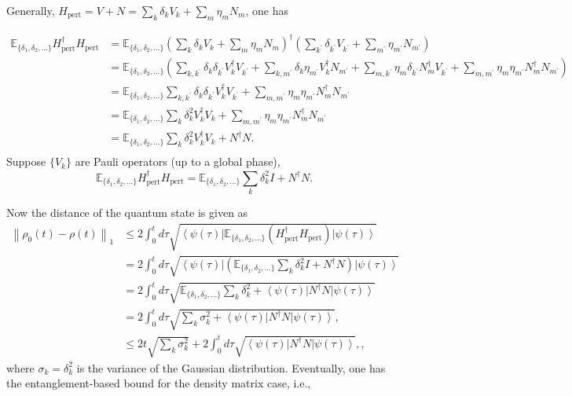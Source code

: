 \documentclass[12pt]{article}
\newcommand{\ket}[1]{\left|#1\right\rangle}
\newcommand{\bra}[1]{\left\langle #1\right|}
\newcommand{\norm}[1]{\left\lVert #1\right\rVert}
\begin{document}
Generally, $H_{\text{pert}} = V+N=\sum_k\delta_k V_k+\sum_m\eta_m N_m$, one has

\begin{equation}
\begin{split}
    \mathbb{E}_{\{\delta_1,\delta_2,...\}}H_{\text{pert}}^\dagger H_{\text{pert}}&=  \mathbb{E}_{\{\delta_1,\delta_2,...\}} (\sum_k \delta_k V_k + \sum_m \eta_m N_m)^\dagger(\sum_{k^\prime} \delta_{k^\prime} V_{k^\prime} + \sum_{m^\prime} \eta_{m^\prime} N_{m^\prime})    \\
    &= \mathbb{E}_{\{\delta_1,\delta_2,...\}}(\sum_{k,k^\prime}\delta_k\delta_{k^\prime} V^\dagger_kV_{k^\prime}+\sum_{k,m^\prime}\delta_k\eta_{m^\prime} V^\dagger_kN_{m^\prime}+\sum_{m,k^\prime}\eta_m\delta_{k^\prime} N^\dagger_mV_{k^\prime}+\sum_{m,m^\prime}\eta_m\eta_{m^\prime} N^\dagger_mN_{m^\prime})\\
    &=\mathbb{E}_{\{\delta_1,\delta_2,...\}}\sum_{k,k^\prime}\delta_k\delta_{k^\prime} V^\dagger_kV_{k^\prime}+\sum_{m,m^\prime}\eta_m\eta_{m^\prime} N^\dagger_mN_{m^\prime}\\
    &=\mathbb{E}_{\{\delta_1,\delta_2,...\}}\sum_{k}\delta^2_k V^\dagger_kV_{k}+\sum_{m,m^\prime}\eta_m\eta_{m^\prime} N^\dagger_mN_{m^\prime}\\
    &=\mathbb{E}_{\{\delta_1,\delta_2,...\}}\sum_{k}\delta^2_k V^\dagger_kV_{k}+N^\dagger N.\\
\end{split}
\end{equation}
Suppose $\{V_k\}$ are Pauli operators (up to a global phase), 
\begin{equation}
     \mathbb{E}_{\{\delta_1,\delta_2,...\}}H_{\text{pert}}^\dagger H_{\text{pert}}=\mathbb{E}_{\{\delta_1,\delta_2,...\}}\sum_{k}\delta^2_k I+N^\dagger N.
\end{equation}

Now the distance of the quantum state is given as
\begin{equation}
\begin{split}
\norm{ \rho_0(t)-\rho(t) }_1 &\le 2 \int_0 ^t d\tau \sqrt{\bra{\psi(\tau)} \mathbb{E}_{\{\delta_1,\delta_2,...\}}( H_{\text{pert}}^\dagger H_{\text{pert}} )\ket{\psi(\tau)}}\\
&=2 \int_0 ^t d\tau \sqrt{\bra{\psi(\tau)} (\mathbb{E}_{\{\delta_1,\delta_2,...\}}\sum_{k}\delta^2_k I+N^\dagger N)\ket{\psi(\tau)}}\\
&=2 \int_0 ^t d\tau \sqrt{\mathbb{E}_{\{\delta_1,\delta_2,...\}}\sum_{k}\delta^2_k+\bra{\psi(\tau)}  N^\dagger N\ket{\psi(\tau)}}\\
&= 2 \int_0 ^t d\tau \sqrt{\sum_k \sigma^2_k+\bra{\psi(\tau)}  N^\dagger N\ket{\psi(\tau)}},\\
&\le 2t \sqrt{\sum_k \sigma^2_k} +2\int_0 ^t d\tau \sqrt{\bra{\psi(\tau)}  N^\dagger N\ket{\psi(\tau)}},\label{eq:disorder},
\end{split}
\end{equation}
where $\sigma_k=\delta^2_k$ is the variance of the Gaussian distribution. Eventually, one has the entanglement-based bound for the density matrix case, i.e.,
\end{document}
